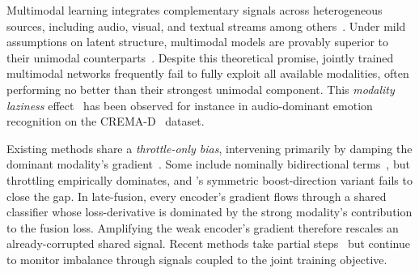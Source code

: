 \documentclass{article} %
\begin{document}

Multimodal learning integrates complementary signals across heterogeneous sources, including audio, visual, and textual streams among others~\citep{baltrusaitis2019multimodal}. Under mild assumptions on latent structure, multimodal models are provably superior to their unimodal counterparts~\citep{huang2021multimodal}. Despite this theoretical promise, jointly trained multimodal networks frequently fail to fully exploit all available modalities, often performing no better than their strongest unimodal component. This \emph{modality laziness} effect~\citep{wang2020gblending,peng2022ogmge,du2023suppression} has been observed for instance in audio-dominant emotion recognition on the CREMA-D~\citep{cao2014cremad} dataset.


Existing methods share a \emph{throttle-only bias}, intervening primarily by damping the dominant modality's gradient~\citep{peng2022ogmge,wei2024mmpareto,guo2024cggm,wei2024opm,fan2023pmr,kontras2024mlgm}. Some include nominally bidirectional terms~\citep{li2023agm,gao2025arm,huang2025inforeg,wei2025improving}, but throttling empirically dominates, and \citet{wei2024opm}'s symmetric boost-direction variant fails to close the gap. In late-fusion, every encoder's gradient flows through a shared classifier whose loss-derivative is dominated by the strong modality's contribution to the fusion loss. Amplifying the weak encoder's gradient therefore rescales an already-corrupted shared signal. Recent methods take partial steps~\citep{yang2025iprm,jiang2025aug} but continue to monitor imbalance through signals coupled to the joint training objective.

\end{document}
